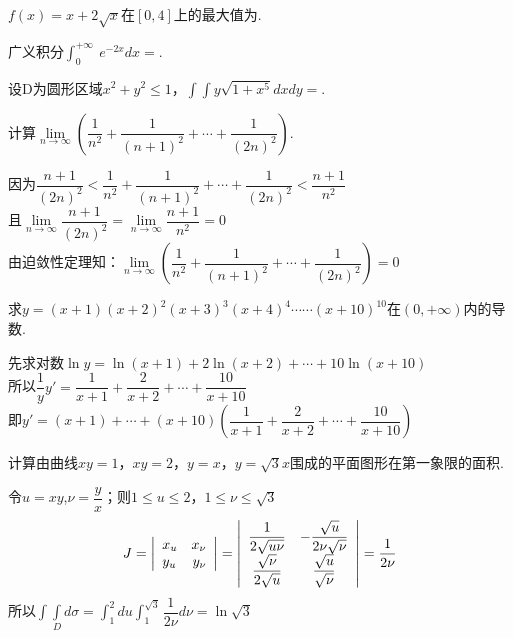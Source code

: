 \documentclass[prescorebox,sealed,cancelspace]{nwsuafexam}%
\begin{document}
\begin{questions}
		\question
		$f(x)=x+2\sqrt{x}\text{在}[0,4]$上的最大值为.
		
		\question
		广义积分$\int^{+\infty}_0~e^{-2x}dx=$.
		
		\question
		设D为圆形区域$x^2+y^2\le 1$，$\int\int y\sqrt{1+x^5}dxdy=$.
		
		\question[10]
		计算$\lim\limits_{n \to \infty}(\dfrac{1}{n^2}+\dfrac{1}{(n+1)^2}+\cdots +\dfrac{1}{(2n)^2})$.
		\begin{Answers}
			因为$\dfrac{n+1}{(2n)^2}<\dfrac{1}{n^2}+\dfrac{1}{(n+1)^2}+\cdots+\dfrac{1}{(2n)^2}<\dfrac{n+1}{n^2}$\\
			且$\lim\limits_{n \to \infty}\dfrac{n+1}{(2n)^2}=\lim\limits_{n \to \infty}\dfrac{n+1}{n^2}=0$\\
			由迫敛性定理知：$\lim\limits_{n \to \infty}(\dfrac{1}{n^2}+\dfrac{1}{(n+1)^2}+\cdots+\dfrac{1}{(2n)^2})=0$
		\end{Answers}
		
		\question[10]
		求$y=(x+1)(x+2)^2(x+3)^3(x+4)^4\cdots\cdots(x+10)^{10}\text{在}(0,+\infty)$内的导数.
		\begin{Answers}
			先求对数$\ln y=\ln(x+1)+2\ln(x+2)+\cdots+10\ln(x+10)$\\
			所以$\dfrac{1}{y}y'=\dfrac{1}{x+1}+\dfrac{2}{x+2}+\cdots+\dfrac{10}{x+10}$\\
			即$y'=(x+1)+\cdots+(x+10)(\dfrac{1}{x+1}+\dfrac{2}{x+2}+\cdots+\dfrac{10}{x+10})$
		\end{Answers}
		
		\question[10]
		计算由曲线$xy=1$，$xy=2$，$y=x$，$y=\sqrt{3}x$围成的平面图形在第一象限的面积.
		\begin{Answers}
			令$u=xy$,$\nu=\dfrac{y}{x}$；则$1\le u \le2$，$1\le \nu \le\sqrt{3}$
			\[ 
				J=\left|
					\begin{array}{lr}
						x_u & x_{\nu} \\
						y_u & y_{\nu} \\
					\end{array}
					\right|=\left|
						\begin{array}{cc}
							\dfrac{1}{2\sqrt{u\nu}} & -\dfrac{\sqrt{u}}{2\nu\sqrt{\nu}}\\
							\dfrac{\sqrt{\nu}}{2\sqrt{u}} & \dfrac{\sqrt{u}}{\sqrt{\nu}} \\
						\end{array}
						\right|=\dfrac{1}{2\nu}
			\]
			所以$\int\int\limits_Dd\sigma=\int^2_1du\int^{\sqrt{3}}_1\dfrac{1}{2\nu}d\nu=\ln\sqrt{3}$
		\end{Answers}
		

\end{questions}
\end{document}
